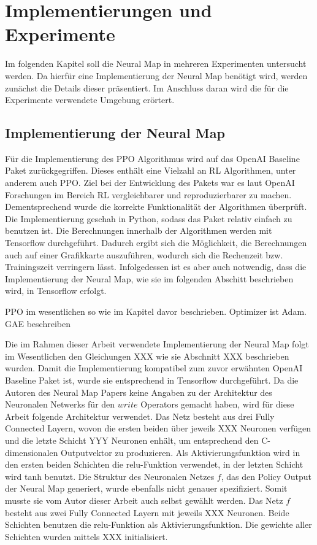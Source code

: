\chapter{Implementierungen und Experimente}

Im folgenden Kapitel soll die Neural Map in mehreren Experimenten untersucht werden. Da hierfür eine Implementierung der Neural Map benötigt wird, werden zunächst die Details dieser präsentiert. Im Anschluss daran wird die für die Experimente verwendete Umgebung erörtert.

\section{Implementierung der Neural Map}

Für die Implementierung des PPO Algorithmus wird auf das OpenAI Baseline Paket zurückgegriffen. Dieses enthält eine Vielzahl an RL Algorithmen, unter anderem auch PPO. Ziel bei der Entwicklung des Pakets war es laut OpenAI Forschungen im Bereich RL vergleichbarer und reproduzierbarer zu machen. Dementsprechend wurde die korrekte Funktionalität der Algorithmen überprüft. Die Implementierung geschah in Python, sodass das Paket relativ einfach zu benutzen ist. Die Berechnungen innerhalb der Algorithmen werden mit Tensorflow durchgeführt. Dadurch ergibt sich die Möglichkeit, die Berechnungen auch auf einer Grafikkarte auszuführen, wodurch sich die Rechenzeit bzw. Trainingszeit verringern lässt. Infolgedessen ist es aber auch notwendig, dass die Implementierung der Neural Map, wie sie im folgenden Abschitt beschrieben wird, in Tensorflow erfolgt.

PPO im wesentlichen so wie im Kapitel davor beschrieben. Optimizer ist Adam. GAE beschreiben

Die im Rahmen dieser Arbeit verwendete Implementierung der Neural Map folgt im Wesentlichen den Gleichungen XXX wie sie Abschnitt XXX beschrieben wurden. Damit die Implementierung kompatibel zum zuvor erwähnten OpenAI Baseline Paket ist, wurde sie entsprechend in Tensorflow durchgeführt. Da die Autoren des Neural Map Papers keine Angaben zu der Architektur des Neuronalen Netwerks für den $write$ Operators gemacht haben, wird für diese Arbeit folgende Architektur verwendet. Das Netz besteht aus drei Fully Connected Layern, wovon die ersten beiden über jeweils XXX Neuronen verfügen und die letzte Schicht YYY Neuronen enhält, um entsprechend den C-dimensionalen Outputvektor zu produzieren. Als Aktivierungsfunktion wird in den ersten beiden Schichten die relu-Funktion verwendet, in der letzten Schicht wird tanh benutzt. Die Struktur des Neuronalen Netzes $f$, das den Policy Output der Neural Map generiert, wurde ebenfalls nicht genauer spezifiziert. Somit musste sie vom Autor dieser Arbeit auch selbst gewählt werden. Das Netz $f$ besteht aus zwei Fully Connected Layern mit jeweils XXX Neuronen. Beide Schichten benutzen die relu-Funktion als Aktivierungsfunktion. Die gewichte aller Schichten wurden mittels XXX initialisiert.

